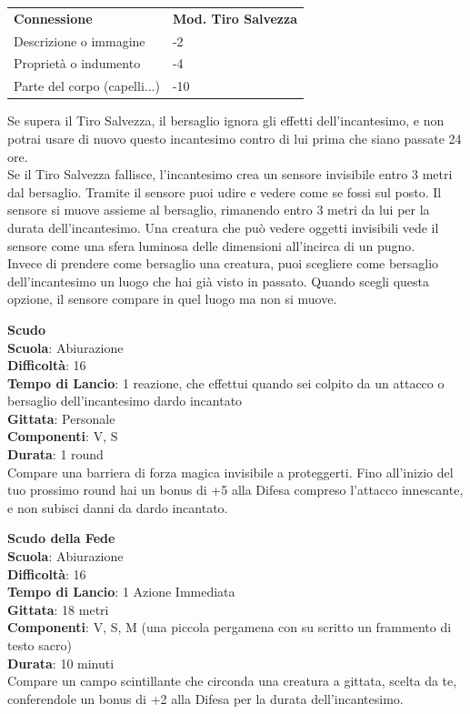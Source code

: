\begin{multicols}{2}
\medskip

\begin{tabular}{ll}
	\toprule
\textbf{Connessione} & \textbf{Mod. Tiro Salvezza}\\
Descrizione o immagine &-2\\
Proprietà o indumento & -4\\
Parte del corpo (capelli...)&-10\\
\end{tabular}
\medskip

Se supera il Tiro Salvezza, il bersaglio ignora gli effetti dell'incantesimo, e non potrai usare di nuovo questo incantesimo contro di lui prima che siano passate 24 ore.\\
Se il Tiro Salvezza fallisce, l'incantesimo crea un sensore invisibile entro 3 metri dal bersaglio. Tramite il sensore puoi udire e vedere come se fossi sul posto. Il sensore si muove assieme al bersaglio, rimanendo entro 3 metri da lui per la durata dell'incantesimo. Una creatura che può vedere oggetti invisibili vede il sensore come una sfera luminosa delle dimensioni all'incirca di un pugno.\\
Invece di prendere come bersaglio una creatura, puoi scegliere come bersaglio dell'incantesimo un luogo che hai già visto in passato. Quando scegli questa opzione, il sensore compare in quel luogo ma non si muove. 

\medskip\textbf{Scudo}\\
\textbf{Scuola}: Abiurazione\\
\textbf{Difficoltà}: 16\\
\textbf{Tempo di Lancio}: 1 reazione, che effettui quando sei colpito da un attacco o bersaglio dell'incantesimo dardo incantato\\
\textbf{Gittata}: Personale\\
\textbf{Componenti}: V, S\\
\textbf{Durata}: 1 round\\
Compare una barriera di forza magica invisibile a proteggerti. Fino all'inizio del tuo prossimo round hai un bonus di +5 alla Difesa compreso l'attacco innescante, e non subisci danni da dardo incantato.

\medskip\textbf{Scudo della Fede}\\
\textbf{Scuola}: Abiurazione\\
\textbf{Difficoltà}: 16\\
\textbf{Tempo di Lancio}: 1 Azione Immediata\\
\textbf{Gittata}: 18 metri\\
\textbf{Componenti}: V, S, M (una piccola pergamena con su scritto un frammento di testo sacro)\\
\textbf{Durata}: 10 minuti\\
Compare un campo scintillante che circonda una creatura a gittata, scelta da te, conferendole un bonus di +2 alla Difesa per la durata dell'incantesimo.


\end{multicols}
